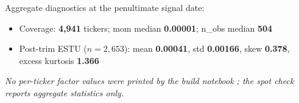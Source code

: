 \documentclass[11pt,a4paper]{article}
\newcommand{\NOTE}[1]{\textcolor{note}{\textit{#1}}}
\begin{document}
Aggregate diagnostics at the penultimate signal date:

\begin{itemize}[leftmargin=*,topsep=2pt,itemsep=2pt]
  \item Coverage: \textbf{4{,}941} tickers; mom median \textbf{0.00001}; n\_obs median \textbf{504}
  \item Post-trim ESTU ($n=2{,}653$): mean \textbf{0.00041}, std \textbf{0.00166}, skew \textbf{0.378}, excess kurtosis \textbf{1.366}
\end{itemize}

\NOTE{No per-ticker factor values were printed by the build notebook
; the spot check reports aggregate statistics only.}
\end{document}
